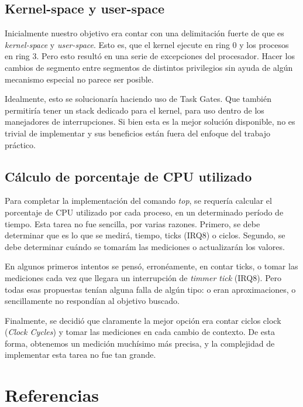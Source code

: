\documentclass[a4paper,10pt]{article}
\begin{document}
      \subsection{Kernel-space y user-space}
      Inicialmente nuestro objetivo era contar con una delimitación fuerte de que es \textit{kernel-space} y \textit{user-space}.
      Esto es, que el kernel ejecute en ring 0 y los procesos en ring 3.
      Pero esto resultó en una serie de excepciones del procesador.
      Hacer los cambios de segmento entre segmentos de distintos privilegios sin ayuda de algún mecanismo especial no parece ser posible.

      Idealmente, esto se solucionaría haciendo uso de Task Gates.
      Que también permitiría tener un stack dedicado para el kernel, para uso dentro de los manejadores de interrupciones.
      Si bien esta es la mejor solución disponible, no es trivial de implementar y sus beneficios están fuera del enfoque del trabajo práctico.
      
      \subsection{Cálculo de porcentaje de CPU utilizado}
      Para completar la implementación del comando \textit{top}, se requería calcular el porcentaje de CPU utilizado por cada proceso, en un determinado
      período de tiempo. Esta tarea no fue sencilla, por varias razones. Primero, se debe determinar que es lo que se medirá, tiempo, ticks (IRQ8) o ciclos. 
      Segundo, se debe determinar cuándo se tomarám las mediciones o actualizarán los valores. 

      En algunos primeros intentos se pensó, erronéamente, en contar ticks, o tomar las mediciones cada vez que llegara un interrupción de \textit{timmer tick} (IRQ8).
      Pero todas esas propuestas tenían alguna falla de algún tipo: o eran aproximaciones, o sencillamente no respondían al objetivo buscado.

      Finalmente, se decidió que claramente la mejor opción era contar ciclos clock (\textit{Clock Cycles}) y tomar las mediciones en cada cambio de contexto.
      De esta forma, obtenemos un medición muchísimo más precisa, y la complejidad de implementar esta tarea no fue tan grande.

\newpage     
\section{Referencias}
\end{document}
